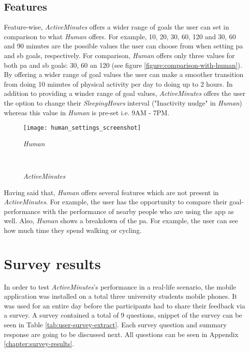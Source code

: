 \subsection{Features}
Feature-wise, \textit{ActiveMinutes} offers a wider range of goals the user can set in comparison to what \textit{Human} offers. For example, 10, 20, 30, 60, 120 and 30, 60 and 90 minutes are the possible values the user can choose from when setting \gls{pa} and \gls{sb} goals, respectively. For comparison, \textit{Human} offers only three values for both \gls{pa} and \gls{sb} goals: 30, 60 an 120 (see figure \ref{figure:comparison-with-human}). By offering a wider range of goal values the user can make a smoother transition from doing 10 minutes of physical activity per day to doing up to 2 hours. In addition to providing a winder range of goal values, \textit{ActiveMinutes} offers the user the option to change their \textit{SleepingHours} interval ("Inactivity nudge" in \textit{Human}) whereas this value in \textit{Human} is pre-set i.e. 9AM - 7PM.

\begin{figure*}[ht]
    \centering
    \begin{subfigure}[t]{0.4\textwidth}
        \centering
        \texttt{[image: human\_settings\_screenshot]}
        \caption{\textit{Human}}
    \end{subfigure}%
    ~ 
    \begin{subfigure}[t]{0.4\textwidth}
        \centering
        \caption{\textit{ActiveMinutes}}
    \end{subfigure}
    \caption{Comparing the system with other solutions}
    \label{figure:comparison-with-human}
\end{figure*}

Having said that, \textit{Human} offers several features which are not present in \textit{ActiveMinutes}. For example, the user has the opportunity to compare their goal-performance with the performance of nearby people who are using the app as well. Also, \textit{Human} shows a breakdown of the \gls{pa}. For example, the user can see how much time they spend walking or cycling. 

\section{Survey results}
In order to test \textit{ActiveMinutes}'s performance in a real-life scenario, the mobile application was installed on a total three university students mobile phones. It was used for an entire day before the participants had to share their feedback via a survey. A survey contained a total of 9 questions, snippet of the survey can be seen in Table \ref{tab:user-survey-extract}. Each survey question and summary response are going to be discussed next. All questions can be seen in Appendix \ref{chapter:survey-results}.

